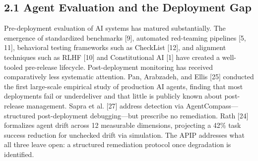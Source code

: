 \subsection{2.1  Agent Evaluation and the Deployment Gap}

Pre-deployment evaluation of AI systems has matured substantially. The emergence of standardized benchmarks [9], automated red-teaming pipelines [5, 11], behavioral testing frameworks such as CheckList [12], and alignment techniques such as RLHF [10] and Constitutional AI [1] have created a well-tooled pre-release lifecycle. Post-deployment monitoring has received comparatively less systematic attention. Pan, Arabzadeh, and Ellis [25] conducted the first large-scale empirical study of production AI agents, finding that most deployments fail or underdeliver and that little is publicly known about post-release management. Sapra et al. [27] address detection via AgentCompass---structured post-deployment debugging---but prescribe no remediation. Rath [24] formalizes agent drift across 12 measurable dimensions, projecting a 42\% task success reduction for unchecked drift via simulation. The APIP addresses what all three leave open: a structured remediation protocol once degradation is identified.

